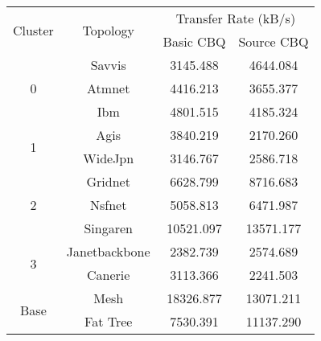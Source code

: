 \begin{tabular}{cccc}
\toprule
\multirow{2}{*}{Cluster} & \multirow{2}{*}{Topology} & \multicolumn{2}{c}{Transfer Rate (kB/s)} \\
& & Basic CBQ & Source CBQ \\
\midrule
\multirow{3}{*}{0} & Savvis & \num{3145.488} & \num{4644.084} \\
& Atmnet & \num{4416.213} & \num{3655.377} \\
& Ibm & \num{4801.515} & \num{4185.324} \\ \hline
\multirow{2}{*}{1} & Agis & \num{3840.219} & \num{2170.260} \\
& WideJpn & \num{3146.767} & \num{2586.718} \\ \hline
\multirow{3}{*}{2} & Gridnet & \num{6628.799} & \num{8716.683} \\
& Nsfnet & \num{5058.813} & \num{6471.987} \\
& Singaren & \num{10521.097} & \num{13571.177} \\ \hline
\multirow{2}{*}{3} & Janetbackbone & \num{2382.739} & \num{2574.689} \\
& Canerie & \num{3113.366} & \num{2241.503} \\ \hline
\multirow{2}{*}{Base} & Mesh & \num{18326.877} & \num{13071.211} \\ 
& Fat Tree & \num{7530.391} & \num{11137.290}\\
\bottomrule
\end{tabular}

